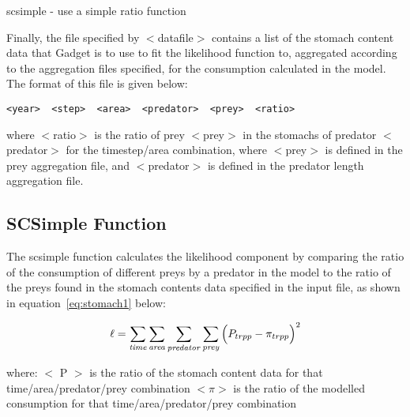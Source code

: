 \documentclass[10pt,twoside]{book}
\begin{document}
\bigskip
scsimple - use a simple ratio function

\bigskip
Finally, the file specified by $<$datafile$>$ contains a list of the stomach content data that Gadget is to use to fit the likelihood function to, aggregated according to the aggregation files specified, for the consumption calculated in the model.  The format of this file is given below:

{\small\begin{verbatim}
<year>  <step>  <area>  <predator>  <prey>  <ratio>
\end{verbatim}}

where $<$ratio$>$ is the ratio of prey $<$prey$>$ in the stomachs of predator $<$predator$>$ for the timestep/area combination, where $<$prey$>$ is defined in the prey aggregation file, and $<$predator$>$ is defined in the predator length aggregation file.

\subsection{SCSimple Function}
The scsimple function calculates the likelihood component by comparing the ratio of the consumption of different preys by a predator in the model to the ratio of the preys found in the stomach contents data specified in the input file, as shown in equation~\ref{eq:stomach1} below:

\begin{equation}\label{eq:stomach1}
\ell = \sum_{\it time}\sum_{\it area}\sum_{\it predator}\sum_{\it prey} \Big( P_{trpp} - \pi_{trpp} \Big) ^2
\end{equation}

where:\newline
$<$ P $>$ is the ratio of the stomach content data for that time/area/predator/prey combination\newline
$<\pi>$ is the ratio of the modelled consumption for that time/area/predator/prey combination


\end{document}
